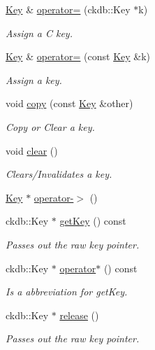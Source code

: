 \begin{DoxyCompactItemize}
\hyperlink{classkdb_1_1Key}{Key} \& \hyperlink{classkdb_1_1Key_a628f3ee543a1d71d4488233018eddd86}{operator=} (ckdb\-::\-Key $\ast$k)
\begin{DoxyCompactList}\small\item\em Assign a C key. \end{DoxyCompactList}\item 
\hyperlink{classkdb_1_1Key}{Key} \& \hyperlink{classkdb_1_1Key_a63a006c140cfd2a633c6fdf3f9eb9d1a}{operator=} (const \hyperlink{classkdb_1_1Key}{Key} \&k)
\begin{DoxyCompactList}\small\item\em Assign a key. \end{DoxyCompactList}\item 
void \hyperlink{classkdb_1_1Key_ab5bc93e22f4cf40b9d2b1fc32cc260be}{copy} (const \hyperlink{classkdb_1_1Key}{Key} \&other)
\begin{DoxyCompactList}\small\item\em Copy or Clear a key.  \end{DoxyCompactList}\item 
void \hyperlink{classkdb_1_1Key_a33a112681b0b2e94e6d369c0f89e361b}{clear} ()
\begin{DoxyCompactList}\small\item\em Clears/\-Invalidates a key. \end{DoxyCompactList}\item 
\hyperlink{classkdb_1_1Key}{Key} $\ast$ \hyperlink{classkdb_1_1Key_ab64ec9d578e083dad3e43322535cf108}{operator-\/$>$} ()
\item 
ckdb\-::\-Key $\ast$ \hyperlink{classkdb_1_1Key_ae81381365a7c159f070e74a7b7bd8688}{get\-Key} () const 
\begin{DoxyCompactList}\small\item\em Passes out the raw key pointer. \end{DoxyCompactList}\item 
ckdb\-::\-Key $\ast$ \hyperlink{classkdb_1_1Key_a6e0dd36c31cc7c46ee1cda0decc6e884}{operator$\ast$} () const 
\begin{DoxyCompactList}\small\item\em Is a abbreviation for get\-Key. \end{DoxyCompactList}\item 
ckdb\-::\-Key $\ast$ \hyperlink{classkdb_1_1Key_a9ae719043e6e99f5f3d6fb85837306f8}{release} ()
\begin{DoxyCompactList}\small\item\em Passes out the raw key pointer. \end{DoxyCompactList}\item 

\end{DoxyCompactItemize}
